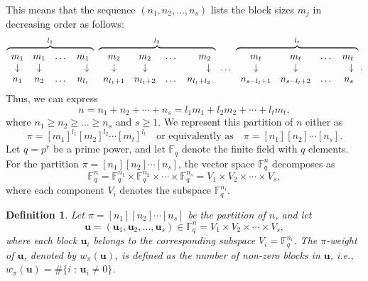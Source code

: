 \documentclass[11pt]{article}
\newtheorem{Definition}[Theorem]{Definition}
\newtheorem{Definition and Notation}[Theorem]{Definition and Notation}
\begin{document}
This means that the sequence $(n_1, n_2, \dots, n_s)$ lists the block sizes $m_j$ in decreasing order as follows:
$$
\overbrace{%
\begin{array}{cccr}
m_1 & m_1 & \dots & m_1 \\
\downarrow & \downarrow & & \downarrow \\
n_1 & n_2 & \dots & n_{l_1}
\end{array}
}^{l_1}
\,\,
\overbrace{%
\begin{array}{cccr}
m_2 & m_2 & \dots & m_2 \\
\downarrow & \downarrow & & \downarrow \\
n_{l_1+1} & n_{l_1+2} & \dots & n_{l_1+l_2}
\end{array}
}^{l_2}
\,\,
\dots
\,\,
\overbrace{%
\begin{array}{cccr}
m_t & m_t & \dots & m_t \\
\downarrow & \downarrow & & \downarrow \\
n_{s-l_t+1} & n_{s-l_t+2} & \dots & n_{s} 
\end{array}
}^{l_t}.
$$
Thus, we can express
$$n = n_1 + n_2 + \cdots + n_s = l_1 m_1 + l_2 m_2 + \cdots + l_t m_t,$$
where $n_1 \ge n_2 \ge \dots \ge n_s$ and $s \ge 1$.
We represent this partition of $n$ either as
$$\pi = [m_1]^{l_1}[m_2]^{l_2}\cdots[m_t]^{l_t}
\quad \text{or equivalently as} \quad
\pi = [n_1][n_2]\cdots[n_s].$$
Let $q = p^{r}$ be a prime power, and let $\mathbb{F}_q$ denote the finite field with $q$ elements.
For the partition $\pi = [n_1][n_2]\cdots[n_s]$, the vector space $\mathbb{F}_q^n$ decomposes as
\begin{equation}
\mathbb{F}_q^n
= \mathbb{F}_q^{n_1} \times \mathbb{F}_q^{n_2} \times \cdots \times \mathbb{F}_q^{n_s}
= V_1 \times V_2 \times \cdots \times V_s,
\end{equation}
where each component $V_i$ denotes the subspace $\mathbb{F}_q^{n_i}$.

\begin{Definition}\label{ma18}
Let $\pi = [n_1][n_2]\cdots[n_s]$ be the partition of $n$, and let
$$
\boldsymbol{u} = (\boldsymbol{u}_1, \boldsymbol{u}_2, \dots, \boldsymbol{u}_s) \in \mathbb{F}_q^n = V_1 \times V_2 \times \cdots \times V_s,
$$
where each block $\boldsymbol{u}_i$ belongs to the corresponding subspace $V_i = \mathbb{F}_q^{n_i}$.
The $\pi$-weight of $\boldsymbol{u}$, denoted by $w_\pi(\boldsymbol{u})$, is defined as the number of non-zero blocks in $\boldsymbol{u}$, i.e.,  $w_\pi(\boldsymbol{u}) = \#\{ i \;:\, \boldsymbol{u}_i \ne 0 \}$.
\end{Definition}
\end{document}
